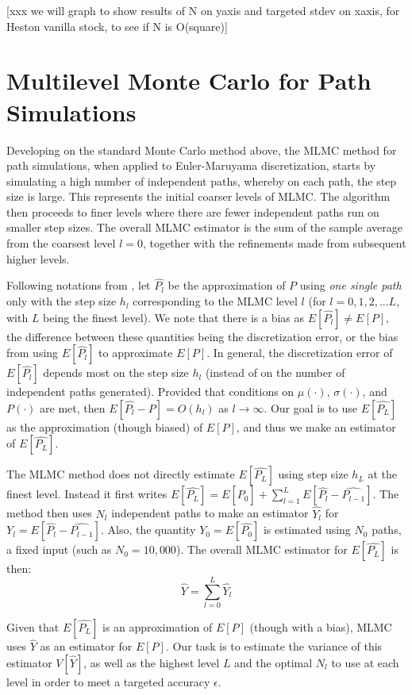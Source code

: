 \documentclass{article}
\begin{document}
    [xxx we will graph to show results of N on yaxis and targeted stdev on xaxis, for Heston vanilla stock, to see if N is O(square)]	

\section{Multilevel Monte Carlo for Path Simulations}
	Developing on the standard Monte Carlo method above, the MLMC method for path simulations, when applied to Euler-Maruyama discretization, starts by simulating a high number of independent paths, whereby on each path, the step size is large. This represents the initial coarser levels of MLMC. The algorithm then proceeds to finer levels where there are fewer independent paths run on smaller step sizes. The overall MLMC estimator is the sum of the sample average from the coarsest level $l=0$, together with the refinements made from subsequent higher levels.
	
	Following notations from \cite{giles08}, let $\widehat{P_l}$ be the approximation of $P$ using \textit{one single path} only with the step size $h_l$ corresponding to the MLMC level $l$ (for $l=0,1,2,...L$, with $L$ being the finest level). We note that there is a bias as $E[\widehat{P_l}] \neq E[P]$, the difference between these quantities being the discretization error, or the bias from using $E[\widehat{P_l}]$ to approximate $E[P]$. In general, the discretization error of $E[\widehat{P_l}]$ depends most on the step size $h_l$ (instead of on the number of independent paths generated). Provided that  conditions on $\mu(\cdot)$, $\sigma(\cdot)$, and $P(\cdot)$ are met, then $E[\widehat{P_l} - P] = O(h_l)$ as $l\rightarrow \infty$. Our goal is to use $E[\widehat{P_L}]$ as the approximation (though biased) of $E[P]$, and thus we make an estimator of $E[\widehat{P_L}]$.
		
    The MLMC method does not directly estimate $E[\widehat{P_L}]$ using step size $h_L$ at the finest level. Instead it first writes $E[\widehat{P_L}] = E[\widehat{P_0}] + \sum_{l=1}^L E[\widehat{P_l} - \widehat{P_{l-1}}]$. The method then uses $N_l$ independent paths to make an estimator $\widehat{Y_l}$ for $Y_l = E[\widehat{P_l} - \widehat{P_{l-1}}]$. Also, the quantity $Y_0 = E[\widehat{P_0}]$ is estimated using $N_0$ paths, a fixed input (such as $N_0=10,000$). The overall MLMC estimator for $E[\widehat{P_L}]$ is then:
	$$\widehat{Y} = \sum_{l=0}^L \widehat{Y_l}$$
	
	Given that $E[\widehat{P_L}]$ is an approximation of $E[P]$ (though with a bias), MLMC uses $\widehat{Y}$ as an estimator for $E[P]$. Our task is to estimate the variance of this estimator $V[\widehat{Y}]$, as well as the highest level $L$ and the optimal $N_l$ to use at each level in order to meet a targeted accuracy $\epsilon$.
	
\end{document}
